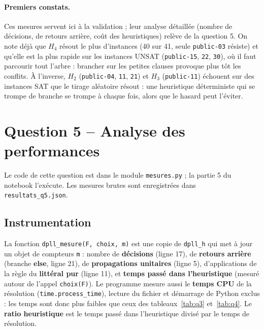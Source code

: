 \documentclass[11pt,a4paper]{article}
\begin{document}
\paragraph{Premiers constats.} Ces mesures servent ici à la validation ; leur analyse détaillée
(nombre de décisions, de retours arrière, coût des heuristiques) relève de la question 5. On
note déjà que $H_4$ résout le plus d'instances (40 sur 41, seule \texttt{public-03} résiste) et
qu'elle est la plus rapide sur les instances UNSAT (\texttt{public-15}, \texttt{22},
\texttt{30}), où il faut parcourir tout l'arbre : brancher sur les petites clauses provoque
plus tôt les conflits. À l'inverse, $H_2$ (\texttt{public-04}, \texttt{11}, \texttt{21}) et $H_3$
(\texttt{public-11}) échouent sur des instances SAT que le tirage aléatoire résout : une
heuristique déterministe qui se trompe de branche se trompe à chaque fois, alors que le hasard
peut l'éviter.

\section{Question 5 -- Analyse des performances}

Le code de cette question est dans le module \texttt{mesures.py} ; la partie 5 du notebook
l'exécute. Les mesures brutes sont enregistrées dans \texttt{resultats\_q5.json}.

\subsection{Instrumentation}

La fonction \texttt{dpll\_mesure(F, choix, m)} est une copie de \texttt{dpll\_h} qui met à jour
un objet de compteurs \texttt{m} : nombre de \textbf{décisions} (ligne 17), de \textbf{retours
arrière} (branche \textbf{else}, ligne 21), de \textbf{propagations unitaires} (ligne 5),
d'applications de la règle du \textbf{littéral pur} (ligne 11), et \textbf{temps passé dans
l'heuristique} (mesuré autour de l'appel \texttt{choix(F)}). Le programme mesure aussi le
\textbf{temps CPU} de la résolution (\texttt{time.process\_time}), lecture du fichier et
démarrage de Python exclus : les temps sont donc plus faibles que ceux des
tableaux~\ref{tab:q3} et~\ref{tab:q4}. Le \textbf{ratio heuristique} est le temps passé dans
l'heuristique divisé par le temps de résolution.
\end{document}
